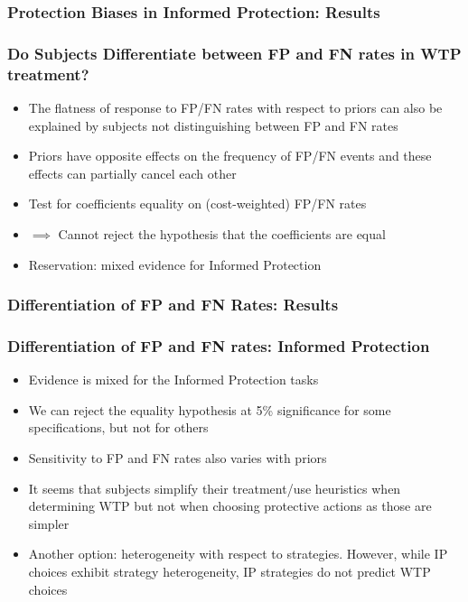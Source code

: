 \documentclass[11pt,hyperref={bookmarks=false}]{beamer}
\begin{document}
\begin{frame}
\frametitle{Protection Biases in Informed Protection: Results}
\scriptsize
\begin{center}

\end{center}
\end{frame}


\begin{frame}
\frametitle{Do Subjects Differentiate between FP and FN rates in WTP treatment?}
\begin{itemize}
\item The flatness of response to FP/FN rates with respect to priors can also be explained by subjects not distinguishing between FP and FN rates
\item Priors have opposite effects on the frequency of FP/FN events and these effects can partially cancel each other
\item Test for coefficients equality on (cost-weighted) FP/FN rates 
\item $\implies$ Cannot reject the hypothesis that the coefficients are equal
\item Reservation: mixed evidence for Informed Protection
\end{itemize}
\end{frame}


\begin{frame}
\frametitle{Differentiation of FP and FN Rates: Results}
\scriptsize

\end{frame}



\begin{frame}
\frametitle{Differentiation of FP and FN rates: Informed Protection}
\begin{itemize}
\item Evidence is mixed for the Informed Protection tasks
\item We can reject the equality hypothesis at 5\% significance for some specifications, but not for others
\item Sensitivity to FP and FN rates also varies with priors
\item It seems that subjects simplify their treatment/use heuristics when determining WTP but not when choosing protective actions as those are simpler
\item Another option: heterogeneity with respect to strategies. However, while IP choices exhibit strategy heterogeneity, IP strategies do not predict WTP choices
\end{itemize}
\end{frame}
\end{document}
